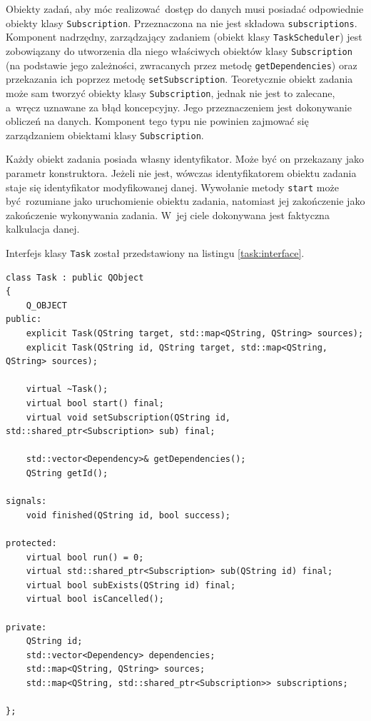 Obiekty zadań, aby móc realizować dostęp do danych musi posiadać odpowiednie obiekty klasy \lstinline$Subscription$. Przeznaczona na nie jest składowa \lstinline$subscriptions$. Komponent nadrzędny, zarządzający zadaniem (obiekt klasy \lstinline$TaskScheduler$) jest zobowiązany do utworzenia dla niego właściwych obiektów klasy \lstinline$Subscription$ (na podstawie jego zależności, zwracanych przez metodę \lstinline$getDependencies$) oraz przekazania ich poprzez metodę \lstinline$setSubscription$. Teoretycznie obiekt zadania może sam tworzyć obiekty klasy \lstinline$Subscription$, jednak nie jest to zalecane, a~wręcz uznawane za błąd koncepcyjny. Jego przeznaczeniem jest dokonywanie obliczeń na danych. Komponent tego typu nie powinien zajmować się zarządzaniem obiektami klasy \lstinline$Subscription$.

Każdy obiekt zadania posiada własny identyfikator. Może być on przekazany jako parametr konstruktora. Jeżeli nie jest, wówczas identyfikatorem obiektu zadania staje się identyfikator modyfikowanej danej. Wywołanie metody \lstinline$start$ może być rozumiane jako uruchomienie obiektu zadania, natomiast jej zakończenie jako zakończenie wykonywania zadania. W~jej ciele dokonywana jest faktyczna kalkulacja danej.

Interfejs klasy \lstinline$Task$ został przedstawiony na listingu \ref{task:interface}. 

\begin{minipage}{\textwidth}
	\begin{lstlisting}[label=task:interface, caption={Interfejs klasy \lstinline$Task$.},alsoletter={()[].=}]
class Task : public QObject
{
	Q_OBJECT
public:
	explicit Task(QString target, std::map<QString, QString> sources);
	explicit Task(QString id, QString target, std::map<QString, QString> sources);

	virtual ~Task();
	virtual bool start() final;
	virtual void setSubscription(QString id, std::shared_ptr<Subscription> sub) final;

	std::vector<Dependency>& getDependencies();
	QString getId();

signals:
	void finished(QString id, bool success);

protected:
	virtual bool run() = 0;
	virtual std::shared_ptr<Subscription> sub(QString id) final;
	virtual bool subExists(QString id) final;
	virtual bool isCancelled();

private:
	QString id;
	std::vector<Dependency> dependencies;
	std::map<QString, QString> sources;
	std::map<QString, std::shared_ptr<Subscription>> subscriptions;

};
	\end{lstlisting}
\end{minipage}

